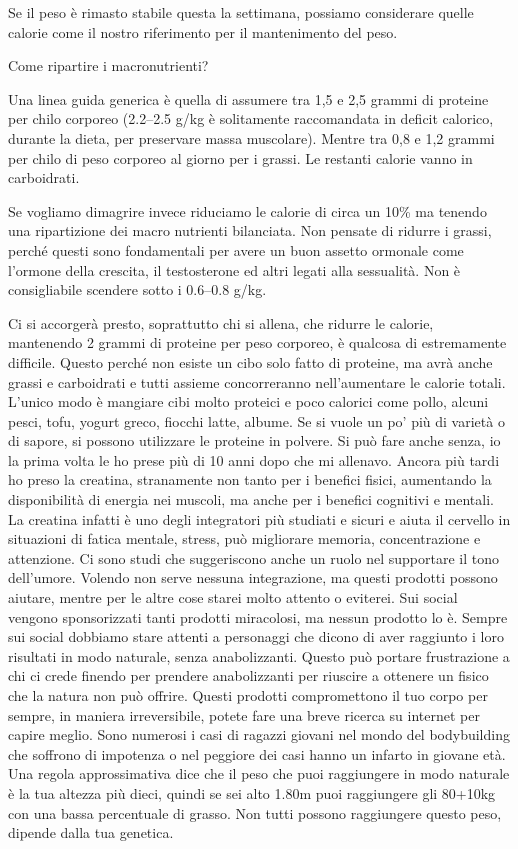 \documentclass[12pt]{book} %
\begin{document}
Se il peso è rimasto stabile questa la settimana, possiamo considerare quelle calorie come il nostro riferimento per il mantenimento del peso.

Come ripartire i macronutrienti?

Una linea guida generica è quella di assumere tra 1,5 e 2,5 grammi di proteine per chilo corporeo (2.2–2.5 g/kg è solitamente raccomandata in deficit calorico, durante la dieta, per preservare massa muscolare). Mentre tra 0,8 e 1,2 grammi per chilo di peso corporeo al giorno per i grassi. Le restanti calorie vanno in carboidrati.

Se vogliamo dimagrire invece riduciamo le calorie di circa un 10\% ma tenendo una ripartizione dei macro nutrienti bilanciata. Non pensate di ridurre i grassi, perché questi sono fondamentali per avere un buon assetto ormonale come l'ormone della crescita, il testosterone ed altri legati alla sessualità. Non è consigliabile scendere sotto i 0.6–0.8 g/kg.

Ci si accorgerà presto, soprattutto chi si allena, che ridurre le calorie, mantenendo 2 grammi di proteine per peso corporeo, è qualcosa di estremamente difficile. Questo perché non esiste un cibo solo fatto di proteine, ma avrà anche grassi e carboidrati e tutti assieme concorreranno nell'aumentare le calorie totali. L'unico modo è mangiare cibi molto proteici e poco calorici come pollo, alcuni pesci, tofu, yogurt greco, fiocchi latte, albume. Se si vuole un po' più di varietà o di sapore, si possono utilizzare le proteine in polvere. Si può fare anche senza, io la prima volta le ho prese più di 10 anni dopo che mi allenavo. Ancora più tardi ho preso la creatina, stranamente non tanto per i benefici fisici, aumentando la disponibilità di energia nei muscoli, ma anche per i benefici cognitivi e mentali. La creatina infatti è uno degli integratori più studiati e sicuri e aiuta il cervello in situazioni di fatica mentale, stress, può migliorare memoria, concentrazione e attenzione. Ci sono studi che suggeriscono anche un ruolo nel supportare il tono dell’umore.
Volendo non serve nessuna integrazione, ma questi prodotti possono aiutare, mentre per le altre cose starei molto attento o eviterei. Sui social vengono sponsorizzati tanti prodotti miracolosi, ma nessun prodotto lo è. Sempre sui social dobbiamo stare attenti a personaggi che dicono di aver raggiunto i loro risultati in modo naturale, senza anabolizzanti. Questo può portare frustrazione a chi ci crede finendo per prendere anabolizzanti per riuscire a ottenere un fisico che la natura non può offrire. Questi prodotti compromettono il tuo corpo per sempre, in maniera irreversibile, potete fare una breve ricerca su internet per capire meglio. Sono numerosi i casi di ragazzi giovani nel mondo del bodybuilding che soffrono di impotenza o nel peggiore dei casi hanno un infarto in giovane età. Una regola approssimativa dice che il peso che puoi raggiungere in modo naturale è la tua altezza più dieci, quindi se sei alto 1.80m puoi raggiungere gli 80+10kg con una bassa percentuale di grasso. Non tutti possono raggiungere questo peso, dipende dalla tua genetica.
\end{document}
